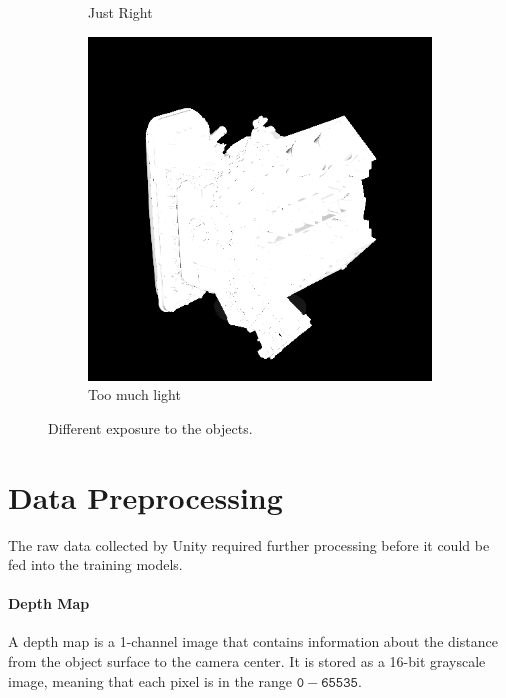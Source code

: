 \begin{figure}[H]
\begin{subfigure}[b]{0.32\linewidth}
		\caption{Just Right}
	\end{subfigure}
	\begin{subfigure}[b]{0.32\linewidth}
		\includegraphics[width=\textwidth]{./Figures/wrong_exposure.png}
		\caption{Too much light}
	\end{subfigure}
	\decoRule
	\caption{Different exposure to the objects.}
	\label{fig:camera_exposure}
\end{figure}




\section{Data Preprocessing}
The raw data collected by Unity required further processing before it could be fed into the training models. 
\paragraph{Depth Map}
A depth map is a 1-channel image that contains information about the distance from the object surface to the camera center. It is stored as a 16-bit grayscale image, meaning that each pixel is in the range $\mathtt{0 - 65535}$. 

